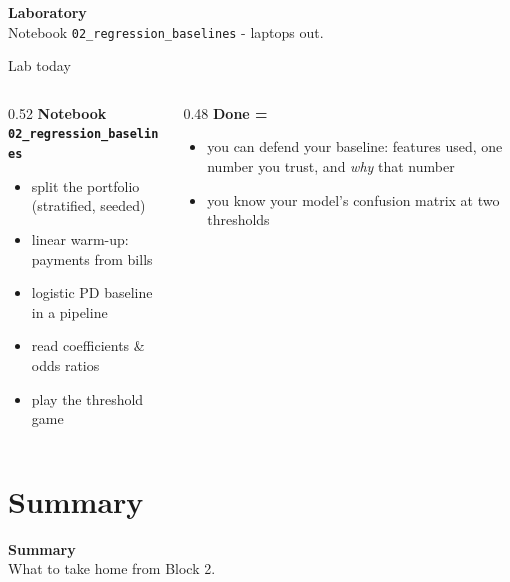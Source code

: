 \documentclass[10pt,aspectratio=169]{beamer}
\begin{document}
\begin{frame}[plain]
  \begin{center}
    \vspace{1.5cm}
    {\LARGE\textbf{Laboratory}}\\[0.6cm]
    {\normalsize Notebook \texttt{02\_regression\_baselines} - laptops out.}
  \end{center}
\end{frame}

\begin{frame}{Lab today}
  \begin{columns}[T]
    \begin{column}{0.52\textwidth}
      \textbf{Notebook \texttt{02\_regression\_baselines}}
      \begin{itemize}\small
        \item split the portfolio (stratified, seeded)
        \item linear warm-up: payments from bills
        \item logistic PD baseline in a pipeline
        \item read coefficients \& odds ratios
        \item play the threshold game
      \end{itemize}
    \end{column}
    \begin{column}{0.48\textwidth}
      \textbf{Done =}
      \begin{itemize}\small
        \item you can defend your baseline: features used, one number you
              trust, and \emph{why} that number
        \item you know your model's confusion matrix at two thresholds
      \end{itemize}
    \end{column}
  \end{columns}
\end{frame}

\section{Summary}

\begin{frame}[plain]
  \begin{center}
    \vspace{1.5cm}
    {\LARGE\textbf{Summary}}\\[0.6cm]
    {\normalsize What to take home from Block 2.}
  \end{center}
\end{frame}
\end{document}
